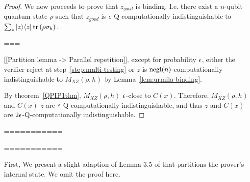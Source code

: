 \begin{proof}
We now proceeds to prove that $z_{good}$ is binding. I.e. there exist a $n$-qubit quantum state $\rho$ such that $z_{good}$ is $\epsilon$-Q-computationally indistinguishable to $\sum_z |z\rangle\langle z| \operatorname{tr}\left(\rho \sigma_h \right)$.

===

 [[Partition lemma ->  Parallel repetition]], except for probability $\epsilon$, either the verifier reject at step~\ref{step:multi-testing} or $z$ is $\operatorname{negl}(n)$-computationally indistinguishable to $M_{XZ}(\rho,h)$ by Lemma~\ref{lem:urmila-binding}. 
 
 By theorem~\ref{QPIP1thm}, $M_{XZ}(\rho,h)$  $\epsilon$-close to $C(x)$. Therefore, $M_{XZ}(\rho,h)$  and  $C(x)$ $z$ are $\epsilon$-Q-computationally indistinguishable, and thus $z$ and $C(x)$ are  $2\epsilon$-Q-computationally indistinguishable.
 
 
\end{proof}

===========


===========



First, We present a slight adaption of Lemma 3.5 of \cite{parallelrep}  that partitions the prover's internal state. We omit the proof here.


